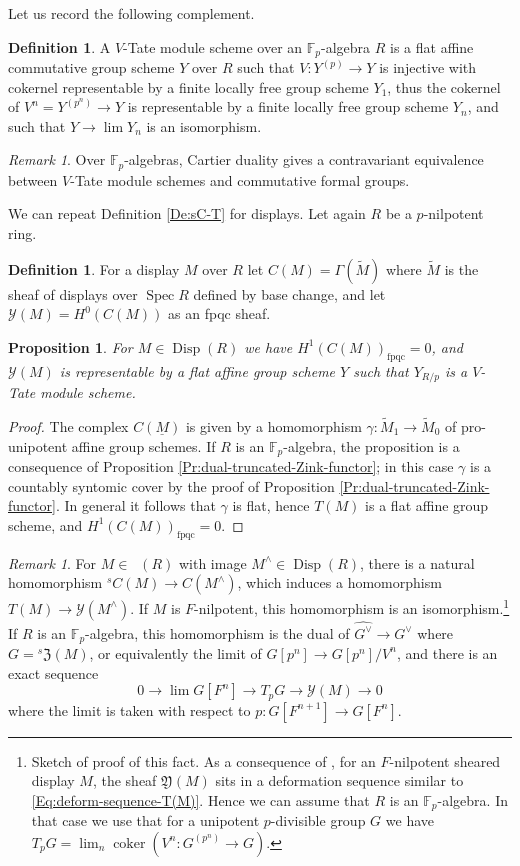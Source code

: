 \documentclass[a4paper,11pt]{amsart}
\theoremstyle{plain}
\newtheorem{Prop}[equation]{Proposition}
\theoremstyle{definition}
\newtheorem{Defn}[equation]{Definition}
\theoremstyle{remark}
\newtheorem{Remark}[equation]{Remark}
\newcommand{\bPr}{\begin{Prop}}
\newcommand{\ePr}{\end{Prop}}
\newcommand{\bDe}{\begin{Defn}}
\newcommand{\eDe}{\end{Defn}}
\newcommand{\bRe}{\begin{Remark}}
\newcommand{\eRe}{\end{Remark}}
\newcommand{\bproof}{\begin{proof}}
\newcommand{\eproof}{\end{proof}}
\renewcommand{\u}{\underline}
\newcommand{\uM}{M} %
\numberwithin{equation}{section}
\newcommand{\YYY}{\mathcal{Y}}
\newcommand{\FY}{\mathfrak{Y}}
\newcommand{\FZ}{\mathfrak{Z}}
\newcommand{\FF}{{\mathbb{F}}}
\DeclareMathOperator{\coker}{coker}
\DeclareMathOperator{\fpqc}{fpqc}
\DeclareMathOperator{\Disp}{Disp}
\DeclareMathOperator{\sDisp}{{}^sDisp}
\DeclareMathOperator{\Spec}{Spec}
\newcommand{\sC}{{}^{s}C}
\newcommand{\sFZ}{{}^s\FZ}
\begin{document}
Let us record the following complement.

\bDe
A $V$-Tate module scheme over an $\FF_p$-algebra $R$ is a flat affine commutative group scheme $Y$ over $R$ such that $V\colon Y^{(p)}\to Y$ is injective with cokernel representable by a finite locally free group scheme $Y_1$, thus the cokernel of $V^n=Y^{(p^n)}\to Y$ is representable by a finite locally free group scheme $Y_n$, and such that $Y\to\lim Y_n$ is an isomorphism.
\eDe

\bRe
Over $\FF_p$-algebras, 
Cartier duality gives a contravariant equivalence between $V$-Tate module schemes and commutative formal groups.
\eRe

We can repeat Definition \ref{De:sC-T} for displays. Let again $R$ be a $p$-nilpotent ring.

\bDe
For a display $\uM$ over $R$ let $C(M)=\Gamma(\tilde{\uM})$ where $\tilde{\uM}$ is the sheaf of displays over $\Spec R$ defined by base change, and let $\YYY(\uM)=H^0(C(\uM))$ as an fpqc sheaf.
\eDe

\bPr
For $\uM\in\Disp(R)$ we have $H^1(C(\uM))_{\fpqc}=0$, and $\YYY(\uM)$ is representable by a flat affine group scheme $Y$ such that $Y_{R/p}$ is a $V$-Tate module scheme.
\ePr

\bproof
The complex $C(\u M)$ is given by a homomorphism $\gamma\colon\tilde M_1\to\tilde M_0$ of pro-unipotent affine group schemes. 
If $R$ is an $\FF_p$-algebra, the proposition is a consequence of Proposition \ref{Pr:dual-truncated-Zink-functor}; in this case $\gamma$ is a countably syntomic cover by the proof of Proposition \ref{Pr:dual-truncated-Zink-functor}. In general it follows that $\gamma$ is flat, hence $T(\uM)$ is a flat affine group scheme, and $H^1(C(\uM))_{\fpqc}=0$.
\eproof

\bRe
For $\uM\in\sDisp(R)$ with image $\uM^\wedge\in\Disp(R)$, there is a natural homomorphism $\sC(\uM)\to C(\uM^\wedge)$, which induces a homomorphism $T(\uM)\to\YYY(\uM^\wedge)$.
If $\uM$ is $F$-nilpotent, this homomorphism is an isomorphism.\footnote{Sketch of proof of this fact. As a consequence of \cite[Corollary 82]{Zink:The-display}, for an $F$-nilpotent sheared display $\uM$, the sheaf $\FY(\uM)$ sits in a deformation sequence similar to \eqref{Eq:deform-sequence-T(M)}. Hence we can assume that $R$ is an $\FF_p$-algebra. In that case we use that for a unipotent $p$-divisible group $G$ we have $T_pG=\lim_n\coker(V^n\colon G^{(p^n)}\to G)$.}
If $R$ is an $\FF_p$-algebra, this homomorphism is the dual of $\widehat{G^\vee}\to G^\vee$ where $G=\sFZ(\uM)$, or equivalently the limit of $G[p^n]\to G[p^n]/V^n$, and there is an exact sequence
\[
0\to \lim G[F^n]\to T_pG\to\YYY(\uM)\to 0
\]
where the limit is taken with respect to $p\colon G[F^{n+1}]\to G[F^n]$.
\eRe
\end{document}
